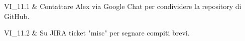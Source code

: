 VI\_11.1 & Contattare Alex via Google Chat per condividere la repository di GitHub.

\tabularnewline
VI\_11.2 & Su JIRA ticket "misc" per segnare compiti brevi.

